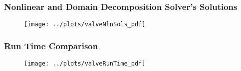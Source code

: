 \documentclass[compress,xcolor=table]{beamer}
\begin{document}
\begin{frame}
\frametitle{Nonlinear and Domain Decomposition Solver's Solutions}

\begin{figure}[h!t]
\centering
\texttt{[image: ../plots/valveNlnSols\_pdf]}
\end{figure}

\end{frame}
\begin{frame}
\frametitle{Run Time Comparison}

\begin{figure}[h!t]
\centering
\texttt{[image: ../plots/valveRunTime\_pdf]}
\end{figure}

\end{frame}
\end{document}
